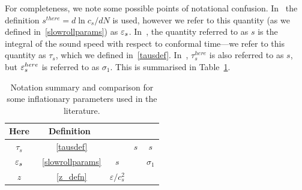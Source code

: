     For completeness, we note some possible points of notational confusion.
    In~\cite{px_burrage} the definition $s^{there}=d\ln c_s/dN$ is used, however we refer to this
    quantity (as we defined in~\eqref{slowrollparams}) as $\varepsilon_{s}$.
    In~\cite{Hu_2011}, the quantity referred to as $s$ is the integral of the sound speed
    with respect to conformal time---we refer to this quantity as $\tau_s$,
    which we defined in~\eqref{tausdef}.
    In~\cite{warp_features_dbi}, $\tau_s^{here}$ is also referred to as $s$,
    but $\varepsilon_{s}^{here}$ is referred to as $\sigma_1$.
    This is summarised in Table~\ref{tab:notation}.


\begin{table}[h!]
  \begin{center}
    \begin{tabular}{ccccc}
        \toprule
        Here & Definition &~\cite{px_burrage}&~\cite{Hu_2011} &~\cite{warp_features_dbi}\\
        \midrule
        $\tau_s$ &~\eqref{tausdef} & ~ & $s$ & $s$ \\
        $\varepsilon_{s}$ &~\eqref{slowrollparams} & $s$ & ~ & $\sigma_1$ \\
        $z$ &~\eqref{z_defn} & $\varepsilon/c_s^2$ & ~ & ~ \\
        \bottomrule
    \end{tabular}
    \caption{
        Notation summary and comparison for some inflationary parameters
        used in the literature.
    }\label{tab:notation}
  \end{center}
\end{table}


